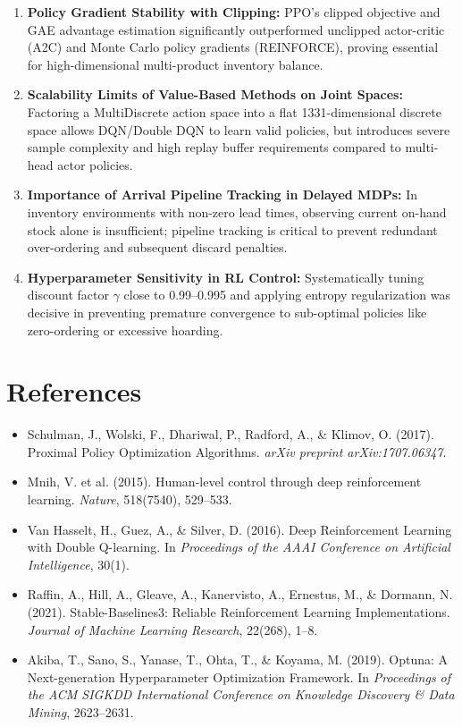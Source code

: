 \documentclass[11pt,a4paper]{article}
\begin{document}
\begin{enumerate}
    \item \textbf{Policy Gradient Stability with Clipping:} PPO's clipped objective and GAE advantage estimation significantly outperformed unclipped actor-critic (A2C) and Monte Carlo policy gradients (REINFORCE), proving essential for high-dimensional multi-product inventory balance.
    \item \textbf{Scalability Limits of Value-Based Methods on Joint Spaces:} Factoring a MultiDiscrete action space into a flat 1331-dimensional discrete space allows DQN/Double DQN to learn valid policies, but introduces severe sample complexity and high replay buffer requirements compared to multi-head actor policies.
    \item \textbf{Importance of Arrival Pipeline Tracking in Delayed MDPs:} In inventory environments with non-zero lead times, observing current on-hand stock alone is insufficient; pipeline tracking is critical to prevent redundant over-ordering and subsequent discard penalties.
    \item \textbf{Hyperparameter Sensitivity in RL Control:} Systematically tuning discount factor $\gamma$ close to 0.99--0.995 and applying entropy regularization was decisive in preventing premature convergence to sub-optimal policies like zero-ordering or excessive hoarding.
\end{enumerate}

\section*{References}

\begin{itemize}
    \item Schulman, J., Wolski, F., Dhariwal, P., Radford, A., \& Klimov, O. (2017). Proximal Policy Optimization Algorithms. \textit{arXiv preprint arXiv:1707.06347}.
    \item Mnih, V. et al. (2015). Human-level control through deep reinforcement learning. \textit{Nature}, 518(7540), 529--533.
    \item Van Hasselt, H., Guez, A., \& Silver, D. (2016). Deep Reinforcement Learning with Double Q-learning. In \textit{Proceedings of the AAAI Conference on Artificial Intelligence}, 30(1).
    \item Raffin, A., Hill, A., Gleave, A., Kanervisto, A., Ernestus, M., \& Dormann, N. (2021). Stable-Baselines3: Reliable Reinforcement Learning Implementations. \textit{Journal of Machine Learning Research}, 22(268), 1--8.
    \item Akiba, T., Sano, S., Yanase, T., Ohta, T., \& Koyama, M. (2019). Optuna: A Next-generation Hyperparameter Optimization Framework. In \textit{Proceedings of the ACM SIGKDD International Conference on Knowledge Discovery \& Data Mining}, 2623--2631.
\end{itemize}
\end{document}
